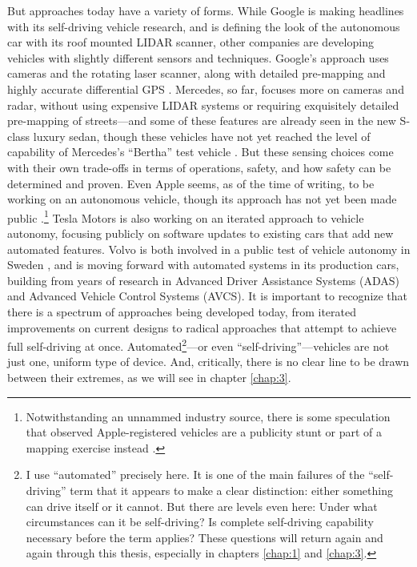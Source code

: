 But approaches today have a variety of forms. While Google is making
headlines with its self-driving vehicle research, and is defining the
look of the autonomous car with its roof mounted LIDAR scanner, other
companies are developing vehicles with slightly different sensors and
techniques. Google's approach uses cameras and the rotating laser
scanner, along with detailed pre-mapping and highly accurate
differential GPS \cite{guizzoHow}. Mercedes, so far, focuses more on
cameras and radar, 
without using expensive LIDAR systems or requiring exquisitely
detailed pre-mapping of streets---and some of these features are
already seen in the new S-class luxury sedan, though these vehicles
have not yet reached the level of capability of Mercedes's ``Bertha''
test vehicle \cite{makingBertha}. But these sensing choices come with their own
trade-offs in terms of operations, safety, and how safety can be
determined and proven. Even Apple seems, as of the time of writing,
to be working on an autonomous vehicle, though its approach has not
yet been made public \cite{taylorApple}.\footnote{Notwithstanding an
  unnammed industry source, there is some
  speculation that observed Apple-registered vehicles are a publicity stunt or part of
  a mapping exercise instead \cite{bonningtonCurious}.} Tesla Motors
is also working on an iterated 
approach to vehicle autonomy, focusing publicly on software updates to
existing cars that add new automated features. Volvo is both involved
in a public test of vehicle autonomy in Sweden \cite{volvoPR}, and is moving forward
with automated systems in its production cars, building from years of
research in Advanced Driver Assistance Systems (ADAS) and Advanced
Vehicle Control Systems (AVCS). It is important to recognize that
there is a spectrum of approaches being developed today, from iterated
improvements on current designs to radical approaches that attempt to
achieve full self-driving at once. Automated\footnote{I use ``automated''
  precisely here. It is one of the main failures of the
  ``self-driving'' term that it appears to make a clear distinction: 
  either something can drive itself or it cannot. But there are
  levels even here: Under what circumstances can it be self-driving? Is
  complete self-driving capability necessary before the term applies?
  These questions will return again and again through this thesis,
  especially in chapters \ref{chap:1} and \ref{chap:3}. }---or even
``self-driving''---vehicles are not just one, uniform type of
device. And, critically, there is no clear
line to be drawn between their extremes, as we will see in chapter
\ref{chap:3}. 


